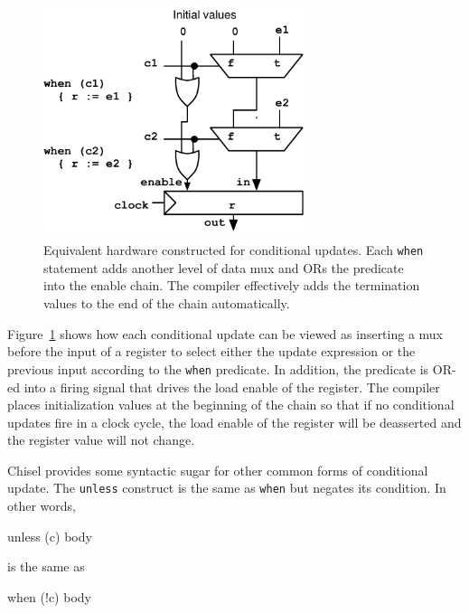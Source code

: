 \documentclass[twocolumn,10pt]{article}
\def\code#1{{\tt #1}}
\begin{document}
\begin{figure}[h]
\centering
\includegraphics[width=3in]{figs/condupdates.pdf}
\caption{Equivalent hardware constructed for conditional updates.
  Each \code{when} statement adds another level of data mux and ORs
  the predicate into the enable chain.  The compiler effectively adds
  the termination values to the end of the chain automatically.}
\label{fig:condupdates}
\end{figure}

Figure~\ref{fig:condupdates} shows how each conditional update can be
viewed as inserting a mux before the input of a register to select
either the update expression or the previous input according to the
\code{when} predicate.  In addition, the predicate is OR-ed into a
firing signal that drives the load enable of the register.  The
compiler places initialization values at the beginning of the chain so
that if no conditional updates fire in a clock cycle, the load enable
of the register will be deasserted and the register value will not
change.
 
Chisel provides some syntactic sugar for other common forms of
conditional update.  The \verb+unless+ construct is the same as
\verb+when+ but negates its condition.  In other words,
\begin{scala}
unless (c) { body }
\end{scala}
is the same as
\begin{scala}
when (!c) { body }
\end{scala}

% 
\end{document}
